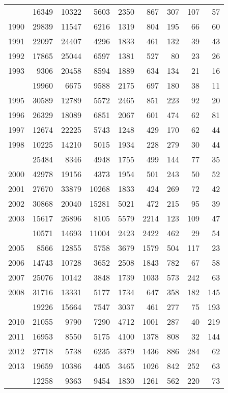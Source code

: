 \documentclass[
]{article}
\begin{document}
\begin{longtable}[t]{lrrrrrrrr}
\endfoot
\bottomrule
\endlastfoot
1989 & 16349 & 10322 & 5603 & 2350 & 867 & 307 & 107 & 57\\
1990 & 29839 & 11547 & 6216 & 1319 & 804 & 195 & 66 & 60\\
1991 & 22097 & 24407 & 4296 & 1833 & 461 & 132 & 39 & 43\\
1992 & 17865 & 25044 & 6597 & 1381 & 527 & 80 & 23 & 26\\
1993 & 9306 & 20458 & 8594 & 1889 & 634 & 134 & 21 & 16\\
\addlinespace
1994 & 19960 & 6675 & 9588 & 2175 & 697 & 180 & 38 & 11\\
1995 & 30589 & 12789 & 5572 & 2465 & 851 & 223 & 92 & 20\\
1996 & 26329 & 18089 & 6851 & 2067 & 601 & 474 & 62 & 81\\
1997 & 12674 & 22225 & 5743 & 1248 & 429 & 170 & 62 & 44\\
1998 & 10225 & 14210 & 5015 & 1934 & 228 & 279 & 30 & 44\\
\addlinespace
1999 & 25484 & 8346 & 4948 & 1755 & 499 & 144 & 77 & 35\\
2000 & 42978 & 19156 & 4373 & 1954 & 501 & 243 & 50 & 52\\
2001 & 27670 & 33879 & 10268 & 1833 & 424 & 269 & 72 & 42\\
2002 & 30868 & 20040 & 15281 & 5021 & 472 & 215 & 95 & 39\\
2003 & 15617 & 26896 & 8105 & 5579 & 2214 & 123 & 109 & 47\\
\addlinespace
2004 & 10571 & 14693 & 11004 & 2423 & 2422 & 462 & 29 & 54\\
2005 & 8566 & 12855 & 5758 & 3679 & 1579 & 504 & 117 & 23\\
2006 & 14743 & 10728 & 3652 & 2508 & 1843 & 782 & 67 & 58\\
2007 & 25076 & 10142 & 3848 & 1739 & 1033 & 573 & 242 & 63\\
2008 & 31716 & 13331 & 5177 & 1734 & 647 & 358 & 182 & 145\\
\addlinespace
2009 & 19226 & 15664 & 7547 & 3037 & 461 & 277 & 75 & 193\\
2010 & 21055 & 9790 & 7290 & 4712 & 1001 & 287 & 40 & 219\\
2011 & 16953 & 8550 & 5175 & 4100 & 1378 & 808 & 32 & 144\\
2012 & 27718 & 5738 & 6235 & 3379 & 1436 & 886 & 284 & 62\\
2013 & 19659 & 10386 & 4405 & 3465 & 1026 & 842 & 252 & 63\\
\addlinespace
2014 & 12258 & 9363 & 9454 & 1830 & 1261 & 562 & 220 & 73\\

\end{longtable}
\end{document}
